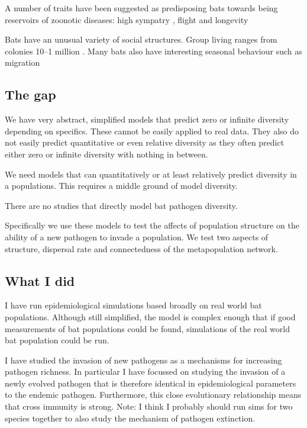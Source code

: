 A number of traits have been suggested as predisposing bats towards being reservoirs of zoonotic diseases: high sympatry \cite{luis2013comparison}, flight \cite{wang2011mass} and longevity \cite{wang2011mass}

Bats have an unusual variety of social structures.
Group living ranges from colonies 10--1 million \cite{jones2009pantheria}.
Many bats also have interesting seasonal behaviour such as migration \cite{richter2008first, fleming2003ecology}


\subsection{The gap}

We have very abstract, simplified models that predict zero or infinite diversity depending on specifics.
These cannot be easily applied to real data.
They also do not easily predict quantitative or even relative diversity as they often predict either zero or infinite diversity with nothing in between.

We need models that can quantitatively or at least relatively predict diversity in a populations.
This requires a middle ground of model diversity.

There are no studies that directly model bat pathogen diversity.

Specifically we use these models to test the affects of population structure on the ability of a new pathogen to invade a population.
We test two aspects of structure, dispersal rate and connectedness of the metapopulation network.


\subsection{What I did}


I have run epidemiological simulations based broadly on real world bat populations.
Although still simplified, the model is complex enough that if good measurements of bat populations could be found, simulations of the real world bat population could be run.

I have studied the invasion of new pathogens as a mechanisms for increasing pathogen richness.
In particular I have focussed on studying the invasion of a newly evolved pathogen that is therefore identical in epidemiological parameters to the endemic pathogen.
Furthermore, this close evolutionary relationship means that cross immunity is strong.
Note: I think I probably should run sims for two species together to also study the mechanism of pathogen extinction.

